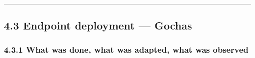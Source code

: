 \begin{center}\rule{0.5\linewidth}{0.5pt}\end{center}

\hypertarget{endpoint-deployment-gochas}{%
\subsection{4.3 Endpoint deployment ---
Gochas}\label{endpoint-deployment-gochas}}

\hypertarget{what-was-done-what-was-adapted-what-was-observed-1}{%
\subsubsection{4.3.1 What was done, what was adapted, what was
observed}\label{what-was-done-what-was-adapted-what-was-observed-1}}

